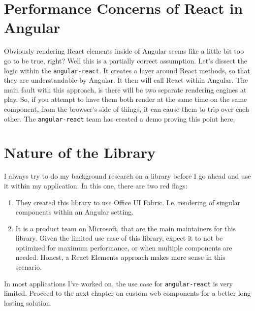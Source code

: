 \section{Performance Concerns of React in Angular}
Obviously rendering React elements inside of Angular seems like a little bit too go to be true, right? Well this is a partially correct assumption. Let's dissect the logic within the \lstinline{angular-react}. It creates a layer around React methods, so that they are understandable by Angular. It then will call React within Angular. The main fault with this approach, is there will be two separate rendering engines at play. So, if you attempt to have them both render at the same time on the same component, from the browser's side of things, it can cause them to trip over each other. The \lstinline{angular-react} team has created a demo proving this point here, 

\section{Nature of the Library}
I always try to do my background research on a library before I go ahead and use it within my application. In this one, there are two red flags: 
\begin{enumerate}
  \item They created this library to use Office UI Fabric. I.e. rendering of singular components within an Angular setting. 
  \item It is a product team on Microsoft, that are the main maintainers for this library. Given the limited use case of this library, expect it to not be optimized for maximum performance, or when multiple components are needed. Honest, a React Elements approach makes more sense in this scenario. 
\end{enumerate}

In most applications I've worked on, the use case for \lstinline{angular-react} is very limited. Proceed to the next chapter on custom web components for a better long lasting solution.